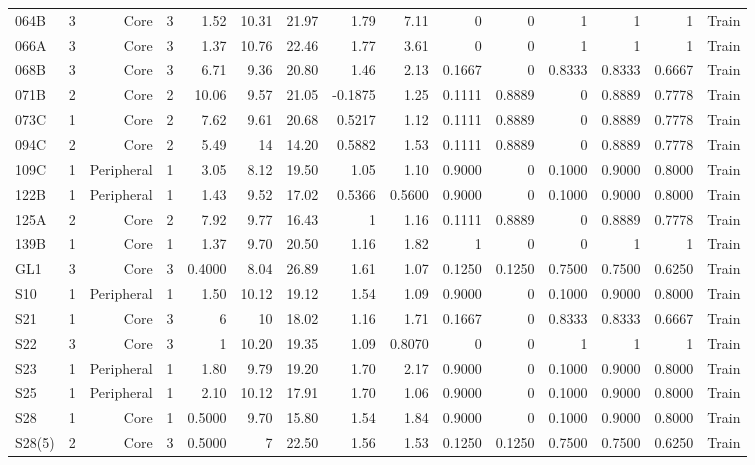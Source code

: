 {\begin{longtable}{lrrrrrrrrrrrrrr}
  064B & 3 & Core & 3 & 1.52 & 10.31 & 21.97 & 1.79 & 7.11 & 0 & 0 & 1 & 1 & 1 & Train \\
  066A & 3 & Core & 3 & 1.37 & 10.76 & 22.46 & 1.77 & 3.61 & 0 & 0 & 1 & 1 & 1 & Train \\
  068B & 3 & Core & 3 & 6.71 & 9.36 & 20.80 & 1.46 & 2.13 & 0.1667 & 0 & 0.8333 & 0.8333 & 0.6667 & Train \\
  071B & 2 & Core & 2 & 10.06 & 9.57 & 21.05 & -0.1875 & 1.25 & 0.1111 & 0.8889 & 0 & 0.8889 & 0.7778 & Train \\
  073C & 1 & Core & 2 & 7.62 & 9.61 & 20.68 & 0.5217 & 1.12 & 0.1111 & 0.8889 & 0 & 0.8889 & 0.7778 & Train \\
  094C & 2 & Core & 2 & 5.49 & 14 & 14.20 & 0.5882 & 1.53 & 0.1111 & 0.8889 & 0 & 0.8889 & 0.7778 & Train \\
  109C & 1 & Peripheral & 1 & 3.05 & 8.12 & 19.50 & 1.05 & 1.10 & 0.9000 & 0 & 0.1000 & 0.9000 & 0.8000 & Train \\
  122B & 1 & Peripheral & 1 & 1.43 & 9.52 & 17.02 & 0.5366 & 0.5600 & 0.9000 & 0 & 0.1000 & 0.9000 & 0.8000 & Train \\
  125A & 2 & Core & 2 & 7.92 & 9.77 & 16.43 & 1 & 1.16 & 0.1111 & 0.8889 & 0 & 0.8889 & 0.7778 & Train \\
  139B & 1 & Core & 1 & 1.37 & 9.70 & 20.50 & 1.16 & 1.82 & 1 & 0 & 0 & 1 & 1 & Train \\
  GL1 & 3 & Core & 3 & 0.4000 & 8.04 & 26.89 & 1.61 & 1.07 & 0.1250 & 0.1250 & 0.7500 & 0.7500 & 0.6250 & Train \\
  S10 & 1 & Peripheral & 1 & 1.50 & 10.12 & 19.12 & 1.54 & 1.09 & 0.9000 & 0 & 0.1000 & 0.9000 & 0.8000 & Train \\
  S21 & 1 & Core & 3 & 6 & 10 & 18.02 & 1.16 & 1.71 & 0.1667 & 0 & 0.8333 & 0.8333 & 0.6667 & Train \\
  S22 & 3 & Core & 3 & 1 & 10.20 & 19.35 & 1.09 & 0.8070 & 0 & 0 & 1 & 1 & 1 & Train \\
  S23 & 1 & Peripheral & 1 & 1.80 & 9.79 & 19.20 & 1.70 & 2.17 & 0.9000 & 0 & 0.1000 & 0.9000 & 0.8000 & Train \\
  S25 & 1 & Peripheral & 1 & 2.10 & 10.12 & 17.91 & 1.70 & 1.06 & 0.9000 & 0 & 0.1000 & 0.9000 & 0.8000 & Train \\
  S28 & 1 & Core & 1 & 0.5000 & 9.70 & 15.80 & 1.54 & 1.84 & 0.9000 & 0 & 0.1000 & 0.9000 & 0.8000 & Train \\
  S28(5) & 2 & Core & 3 & 0.5000 & 7 & 22.50 & 1.56 & 1.53 & 0.1250 & 0.1250 & 0.7500 & 0.7500 & 0.6250 & Train \\

\end{longtable}}
